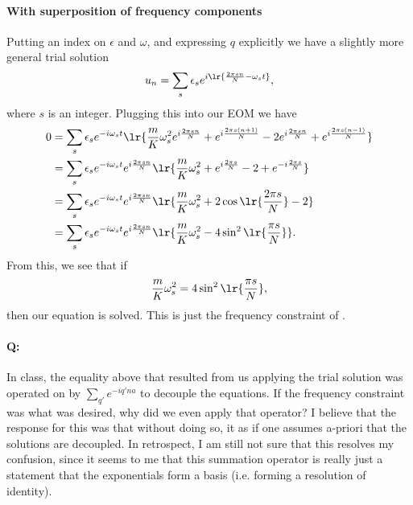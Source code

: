 \paragraph{With superposition of frequency components}
Putting an index on \(\epsilon\) and \(\omega\), and expressing \(q\) explicitly we have a slightly more general trial solution
%
\begin{equation}\label{eqn:condensedMatterLecture7Phonons:380}
u_n = \sum_s \epsilon_s
e^{i \lr{
\frac{ 2 \pi s n}{N} - \omega_s t
} },
\end{equation}
%
where \(s\) is an integer.  Plugging this into our EOM we have
%
\begin{equation}\label{eqn:condensedMatterLecture7Phonons:400}
\begin{aligned}
0
&= \sum_s \epsilon_s e^{-i \omega_s t }
\lr{
\frac{m}{K}\omega_s^2
e^{i
\frac{ 2 \pi s n}{N}
}
+
e^{i
\frac{ 2 \pi s (n+1)}{N}
}
- 2
e^{i
\frac{ 2 \pi s n}{N}
}
+
e^{i
\frac{ 2 \pi s (n-1)}{N}
}
}
\\ &= \sum_s \epsilon_s e^{-i \omega_s t }
e^{i
\frac{ 2 \pi s n}{N}
}
\lr{
\frac{m}{K}\omega_s^2
+
e^{i
\frac{ 2 \pi s}{N}
}
- 2
+
e^{-i
\frac{ 2 \pi s }{N}
}
}
\\ &= \sum_s \epsilon_s e^{-i \omega_s t }
e^{i
\frac{ 2 \pi s n}{N}
}
\lr{
\frac{m}{K}\omega_s^2
+
2 \cos
\lr{
\frac{ 2 \pi s}{N}
}
- 2
}
\\ &= \sum_s \epsilon_s e^{-i \omega_s t }
e^{i
\frac{ 2 \pi s n}{N}
}
\lr{
\frac{m}{K}\omega_s^2
- 4 \sin^2
\lr{
\frac{ \pi s}{N}
}
}.
\end{aligned}
\end{equation}
%
From this, we see that if
%
\begin{equation}\label{eqn:condensedMatterLecture7Phonons:420}
\frac{m}{K}\omega_s^2 =
4 \sin^2
\lr{
\frac{ \pi s}{N}
},
\end{equation}
%
then our equation is solved.  This is just the frequency constraint of .
%
\paragraph{Q:} In class, the equality above that resulted from us applying the trial solution was operated on by \(\sum_{q'} e^{-i q' n a}\) to decouple the equations.  If the frequency constraint was what was desired, why did we even apply that operator?
%
I believe that the response for this was that without doing so, it as if one assumes a-priori that the solutions are decoupled.  In retrospect, I am still not sure that this resolves my confusion, since it seems to me that this summation operator is really just a statement that the exponentials form a basis (i.e. forming a resolution of identity).

